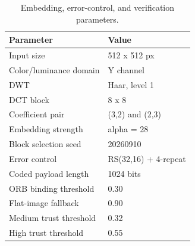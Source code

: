 \begin{table}[t]
\centering
\caption{Embedding, error-control, and verification parameters.}
\label{tab:parameters}
\begin{tabular}{l l}
\toprule
Parameter & Value \\
\midrule
Input size & 512 x 512 px \\
Color/luminance domain & Y channel \\
DWT & Haar, level 1 \\
DCT block & 8 x 8 \\
Coefficient pair & (3,2) and (2,3) \\
Embedding strength & alpha = 28 \\
Block selection seed & 20260910 \\
Error control & RS(32,16) + 4-repeat \\
Coded payload length & 1024 bits \\
ORB binding threshold & 0.30 \\
Flat-image fallback & 0.90 \\
Medium trust threshold & 0.32 \\
High trust threshold & 0.55 \\
\bottomrule
\end{tabular}
\end{table}
